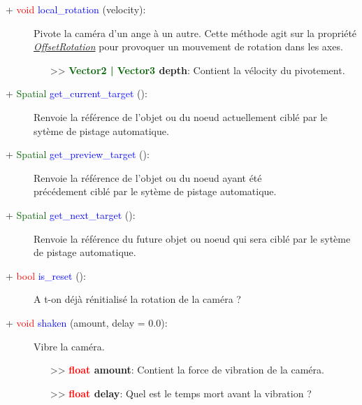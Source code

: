 \documentclass[a4paper, 11pt]{article}
\begin{document}
	\begin{description}
		\item [+ \textcolor{red}{void} \textcolor{blue}{local\_rotation} (velocity):] Pivote la caméra d'un 
		ange à un autre. Cette méthode agit sur la propriété \textit{\hyperlink{ofstrot}{OffsetRotation}} 
		pour provoquer un mouvement de rotation dans les axes.
		\begin{itemize}
			\item [>> \textbf{\textcolor{darkgreen}{Vector2 | Vector3} depth}:] Contient la vélocity du 
			pivotement.\\
		\end{itemize}
	\end{description}
	\begin{description}
		\item [+ \textcolor{darkgreen}{Spatial} \textcolor{blue}{get\_current\_target} ():] Renvoie la 
		référence de l'objet ou du noeud actuellement ciblé par le sytème de pistage automatique.\\
	\end{description}
	\begin{description}
		\item [+ \textcolor{darkgreen}{Spatial} \textcolor{blue}{get\_preview\_target} ():] Renvoie la 
		référence de l'objet ou du noeud ayant été \\précédement ciblé par le sytème de pistage automatique.
		\\
	\end{description}
	\begin{description}
		\item [+ \textcolor{darkgreen}{Spatial} \textcolor{blue}{get\_next\_target} ():] Renvoie la
		référence du future objet ou noeud qui sera ciblé par le sytème de pistage automatique.\\
	\end{description}
	\begin{description}
		\item [+ \textcolor{red}{bool} \textcolor{blue}{is\_reset} ():] A t-on déjà rénitialisé la rotation 
		de la caméra ?\\
	\end{description}
	\begin{description}
		\item [+ \textcolor{red}{void} \textcolor{blue}{shaken} (amount, delay = 0.0):] Vibre la caméra.
		\begin{itemize}
			\item [>> \textbf{\textcolor{red}{float} amount}:] Contient la force de vibration de la caméra.
			\item [>> \textbf{\textcolor{red}{float} delay}:] Quel est le temps mort avant la vibration ?\\
		\end{itemize}
	\end{description}
\end{document}
